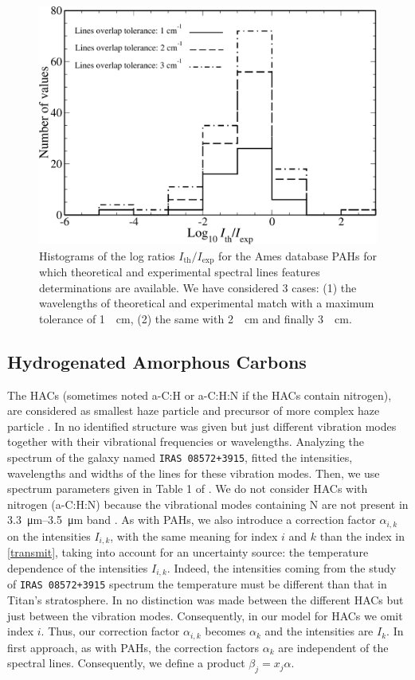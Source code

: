 \documentclass{arxiv-icarus}
\begin{document}
\begin{figure}[!ht]
    \includegraphics[width=.9\linewidth]{Fig_8}
    \caption{Histograms of the log ratios $I_\text{th} / I_\text{exp}$ for the Ames database PAHs for which theoretical and experimental
    spectral lines features determinations are available. We have considered 3 cases:
    (1) the wavelengths of theoretical and experimental match with a maximum tolerance of \SI{1}{\per\cm},
    (2) the same with \SI{2}{\per\cm} and finally \SI{3}{\per\cm}.}
    \label{fig:histoRappIthsIexp}
\end{figure}


\subsection{Hydrogenated Amorphous Carbons}

The HACs (sometimes noted {a-C:H} or {a-C:H:N} if the HACs contain nitrogen), are considered as smallest haze particle and precursor of more complex haze particle \citep[p.304]{Lavvas2011a,Muller-Wodarg2013}.
In \cite{Dartois2004,Dartois2005,Dartois2007} no identified structure was given but just different vibration modes together with their vibrational frequencies or wavelengths.
Analyzing the spectrum of the galaxy named \texttt{IRAS 08572+3915}, \cite{Dartois2007} fitted the intensities, wavelengths and widths of the lines for these vibration modes.
Then, we use spectrum parameters given in Table 1 of \cite{Dartois2007}. We do not consider HACs with nitrogen ({a-C:H:N}) because the vibrational modes containing N are not present in \SIrange{3.3}{3.5}{\um} band \citep{Dartois2005}. As with PAHs, we also introduce a correction factor $\alpha_{i,k}$ on the intensities $I_{i,k}$, with the same meaning for index $i$ and $k$ than the index in \eqref{transmit}, taking into account for an uncertainty source: the temperature dependence of the intensities $I_{i,k}$. Indeed, the intensities coming from the study of \texttt{IRAS 08572+3915} spectrum the temperature must be different than that in Titan's stratosphere. In \cite{Dartois2007} no distinction was made between the different HACs but just between the vibration modes. Consequently, in our model for HACs we omit index $i$. Thus, our correction factor $\alpha_{i,k}$ becomes $\alpha_k$ and the intensities are $I_k$. In first approach, as with PAHs, the correction factors $\alpha_k$ are independent of the spectral lines. Consequently, we define a product $\beta_j = x_j\alpha$.
\end{document}
